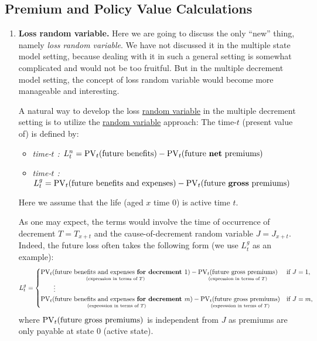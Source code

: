 \subsection{Premium and Policy Value Calculations}
\begin{enumerate}
\item \textbf{Loss random variable.} Here we are going to discuss the only
``new'' thing, namely \emph{loss random variable}. We have not discussed it in
the multiple state model setting, because dealing with it in such a general
setting is somewhat complicated and would not be too fruitful. But in the
multiple decrement model setting, the concept of loss random variable would
become more manageable and interesting.

A natural way to develop the loss \underline{random variable} in the multiple
decrement setting is to utilize the \underline{random variable} approach: The
time-\(t\) (present value of)  is defined by:
\begin{itemize}
\item \emph{time-\(t\) :} \(L_t^n=\operatorname{PV}_{t}(\text{future
benefits})-\operatorname{PV}_{t}(\text{future \textbf{net} premiums})\)
\item \emph{time-\(t\) :} \(L_t^g=\operatorname{PV}_{t}(\text{future
benefits and expenses})-\operatorname{PV}_{t}(\text{future \textbf{gross} premiums})\)
\end{itemize}
Here we assume that the life (aged \(x\)  time \(0\)) is active
 time \(t\).

As one may expect, the terms would involve the time of occurrence of decrement
\(T=T_{x+t}\) and the cause-of-decrement random variable \(J=J_{x+t}\).
Indeed, the future loss often takes the following form (we use \(L_t^g\) as an
example):
\[
L_t^g=\begin{cases}
\underset{\text{(expression in terms of \(T\))}}{\operatorname{PV}_{t}(\text{future benefits and expenses \textbf{for decrement \(1\)}})}
-\underset{\text{(expression in terms of \(T\))}}{\operatorname{PV}_{t}(\text{future gross premiums})}
&\text{if \(J=1\)}, \\
\qquad\vdots& \\
\underset{\text{(expression in terms of \(T\))}}{\operatorname{PV}_{t}(\text{future benefits and expenses \textbf{for decrement \(m\)}})}
-\underset{\text{(expression in terms of \(T\))}}{\operatorname{PV}_{t}(\text{future gross premiums})}
&\text{if \(J=m\)},
\end{cases}
\]
where \(\operatorname{PV}_{t}(\text{future gross premiums})\) is independent from \(J\) as
premiums are only payable at state \(0\) (active state).


\end{enumerate}
